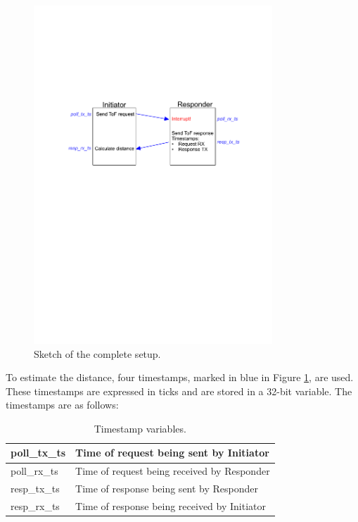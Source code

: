 \begin{center}
	\begin{figure}[!hbt]
		\centering
		\includegraphics[width=0.8\textwidth]{pictures/ToF_scheme.pdf}
		\caption{Sketch of the complete setup.}
		\label{fig:tof_sketch}
	\end{figure}
\end{center}


To estimate the distance, four timestamps, marked in blue in Figure \ref{fig:tof_sketch}, are used. These timestamps are expressed in ticks and are stored in a 32-bit variable. The timestamps are as follows:

\begin{center}
	\begin{table}[!hbt]
		\begin{tabular}{ | m{5em} | m{10cm} |} 
			\hline
			poll\_tx\_ts & Time of request being sent by Initiator \\ 
			\hline
			poll\_rx\_ts & Time of request being received by Responder \\ 
			\hline
			resp\_tx\_ts & Time of response being sent by Responder \\ 
			\hline
			resp\_rx\_ts & Time of response being received by Initiator \\ 
			\hline
		\end{tabular}
		\caption{Timestamp variables.}
		\label{tab:timestamps}
	\end{table}
\end{center}


